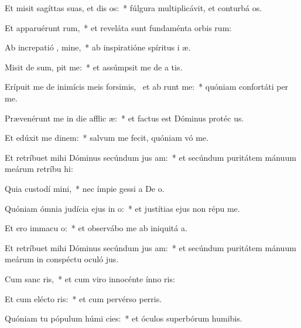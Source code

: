 \item Et misit sagíttas suas, et dis os:~* fúlgura multiplicávit, et conturbá os.
\item Et apparuérunt  rum,~* et reveláta sunt fundaménta orbis rum:
\item Ab increpatió , mine,~* ab inspiratióne spíritus i æ.
\item Misit de sum,  pit me:~* et assúmpsit me de a tis.
\item Erípuit me de inimícis meis forsimis,~\pscross{} et ab   runt me:~* quóniam confortáti  per me.
\item Prævenérunt me in die afflic æ:~* et factus est Dóminus protéc us.
\item Et edúxit me  dinem:~* salvum me fecit, quóniam vó me.
\item Et retríbuet mihi Dóminus secúndum jus am:~* et secúndum puritátem mánuum meárum retríbu hi:
\item Quia custodí  mini,~* nec ímpie gessi a De o.
\item Quóniam ómnia judícia ejus in  o:~* et justítias ejus non répu  me.
\item Et ero immacu  o:~* et observábo me ab iniquitá a.
\item Et retríbuet mihi Dóminus secúndum jus am:~* et secúndum puritátem mánuum meárum in conspéctu oculó jus.
\item Cum sanc  ris,~* et cum viro innocénte ínno ris:
\item Et cum elécto  ris:~* et cum pervérso perris.
\item Quóniam tu pópulum húmi  cies:~* et óculos superbórum humibis.
